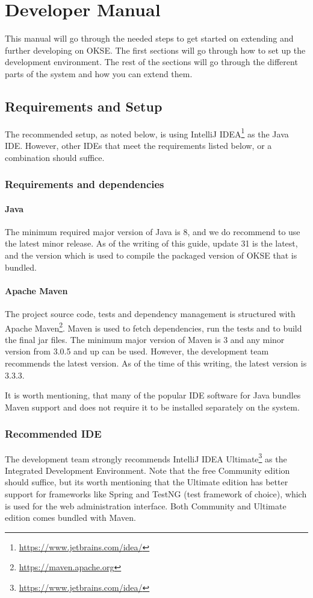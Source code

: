 \chapter{Developer Manual}
\label{appendix-developer-manual}
This manual will go through the needed steps to get started on extending and further developing on OKSE. The first sections will go through how to set up the development environment. The rest of the sections will go through the different parts of the system and how you can extend them.

\section{Requirements and Setup}
The recommended setup, as noted below, is using IntelliJ IDEA\footnote{\url{https://www.jetbrains.com/idea/}} as the Java IDE. However, other IDEs that meet the requirements listed below, or a combination should suffice. 

\subsection{Requirements and dependencies}

\subsubsection{Java}
The minimum required major version of Java is 8, and we do recommend to use the latest minor release. As of the writing of this guide, update 31 is the latest, and the version which is used to compile the packaged version of OKSE that is bundled.

\subsubsection{Apache Maven}
The project source code, tests and dependency management is structured with Apache Maven\footnote{\url{https://maven.apache.org}}. Maven is used to fetch dependencies, run the tests and to build the final jar files. The minimum major version of Maven is 3 and any minor version from 3.0.5 and up can be used. However, the development team recommends the latest version. As of the time of this writing, the latest version is 3.3.3.

It is worth mentioning, that many of the popular IDE software for Java bundles Maven support and does not require it to be installed separately on the system.

\subsection{Recommended IDE}
The development team strongly recommends IntelliJ IDEA Ultimate\footnote{\url{https://www.jetbrains.com/idea/}} as the Integrated Development Environment. Note that the free Community edition should suffice, but its worth mentioning that the Ultimate edition has better support for frameworks like Spring and TestNG (test framework of choice), which is used for the web administration interface. Both Community and Ultimate edition comes bundled with Maven.

